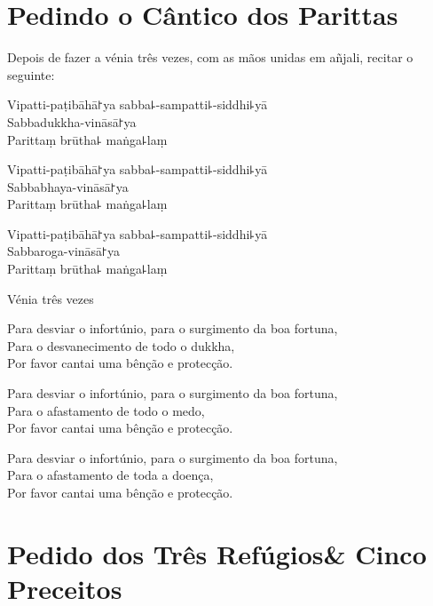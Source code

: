 \clearpage
\chapter{Pedindo o Cântico dos Parittas}

\begin{instruction}
  Depois de fazer a vénia três vezes, com as mãos unidas em añjali, recitar o seguinte:
\end{instruction}

Vipatti-paṭibāhā꜓ya sabba꜕-sampatti꜕-siddhi꜕yā\\
Sabbadukkha-vināsā꜓ya\\
Parittaṃ brūtha꜕ maṅga꜕laṃ

Vipatti-paṭibāhā꜓ya sabba꜕-sampatti꜕-siddhi꜕yā\\
Sabbabhaya-vināsā꜓ya\\
Parittaṃ brūtha꜕ maṅga꜕laṃ

Vipatti-paṭibāhā꜓ya sabba꜕-sampatti꜕-siddhi꜕yā\\
Sabbaroga-vināsā꜓ya\\
Parittaṃ brūtha꜕ maṅga꜕laṃ

\begin{instruction}
  Vénia três vezes
\end{instruction}

\begin{english}
Para desviar o infortúnio, para o surgimento da boa fortuna,\\
Para o desvanecimento de todo o dukkha,\\
Por favor cantai uma bênção e protecção.

Para desviar o infortúnio, para o surgimento da boa fortuna,\\
Para o afastamento de todo o medo,\\
Por favor cantai uma bênção e protecção.

Para desviar o infortúnio, para o surgimento da boa fortuna,\\
Para o afastamento de toda a doença,\\
Por favor cantai uma bênção e protecção.
\end{english}

\setlength{\englishIndent}{\leaderIndent}

\clearpage
\chapter[Três Refúgios \& Cinco Preceitos]{Pedido dos Três Refúgios\newline \& Cinco Preceitos}

